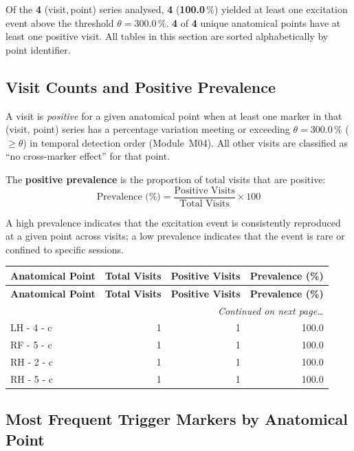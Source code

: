 \documentclass[a4paper,11pt]{article}
\begin{document}
\noindent
Of the \textbf{4} (visit,\,point) series analysed,
\textbf{4} (\textbf{100.0}\,\%) yielded at least one
excitation event above the threshold $\theta = 300.0\,\%$.
\textbf{4} of \textbf{4} unique anatomical points
have at least one positive visit.
All tables in this section are sorted alphabetically by point identifier.

\subsection{Visit Counts and Positive Prevalence}

A visit is \emph{positive} for a given anatomical point when at least one marker in that
(visit, point) series has a percentage variation meeting or exceeding
$\theta = 300.0\,\%$ ($\geq \theta$) in temporal detection order (Module~M04).
All other visits are classified as ``no cross-marker effect'' for that point.

The \textbf{positive prevalence} is the proportion of total visits that are positive:
\[
  \text{Prevalence (\%)} = \frac{\text{Positive Visits}}{\text{Total Visits}} \times 100
\]

A high prevalence indicates that the excitation event is consistently reproduced at a given
point across visits; a low prevalence indicates that the event is rare or confined to
specific sessions.

\begin{small}
\begin{longtable}{p{5cm}rrr}
\toprule
\textbf{Anatomical Point} &
\textbf{Total Visits} &
\textbf{Positive Visits} &
\textbf{Prevalence (\%)} \\
\midrule
\endfirsthead
\toprule
\textbf{Anatomical Point} &
\textbf{Total Visits} &
\textbf{Positive Visits} &
\textbf{Prevalence (\%)} \\
\midrule
\endhead
\midrule
\multicolumn{4}{r}{\small\emph{Continued on next page\ldots}} \\
\endfoot
\bottomrule
\endlastfoot
LH - 4 - c & 1 & 1 & 100.0 \\
RF - 5 - c & 1 & 1 & 100.0 \\
RH - 2 - c & 1 & 1 & 100.0 \\
RH - 5 - c & 1 & 1 & 100.0 \\
\end{longtable}
\end{small}

\subsection{Most Frequent Trigger Markers by Anatomical Point}
\end{document}

